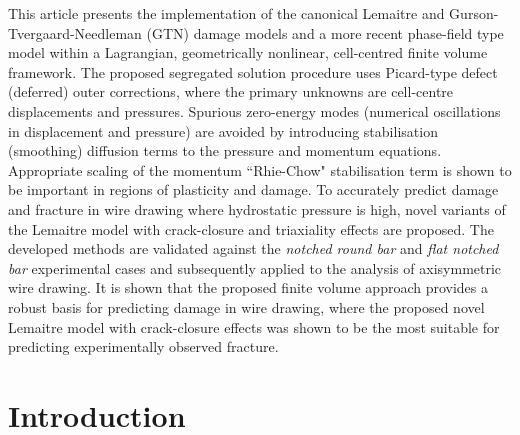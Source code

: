 \documentclass[sn-mathphys,Numbered]{sn-jnl}%
\begin{document}
\abstract
{
This article presents the implementation of the canonical Lemaitre and Gurson-Tvergaard-Needleman (GTN) damage models and a more recent phase-field type model within a Lagrangian, geometrically nonlinear, cell-centred finite volume framework.
The proposed segregated solution procedure uses Picard-type defect (deferred) outer corrections, where the primary unknowns are cell-centre displacements and pressures.
Spurious zero-energy modes (numerical oscillations in displacement and pressure) are avoided by introducing stabilisation (smoothing) diffusion terms to the pressure and momentum equations.
Appropriate scaling of the momentum ``Rhie-Chow" stabilisation term is shown to be important in regions of plasticity and damage.
To accurately predict damage and fracture in wire drawing where hydrostatic pressure is high, novel variants of the Lemaitre model with crack-closure and triaxiality effects are proposed.
The developed methods are validated against the \emph{notched round bar} and \emph{flat notched bar} experimental cases and subsequently applied to the analysis of axisymmetric wire drawing.
It is shown that the proposed finite volume approach provides a robust basis for predicting damage in wire drawing, where the proposed novel Lemaitre model with crack-closure effects was shown to be the most suitable for predicting experimentally observed fracture.
}




\maketitle


\section{Introduction}\label{sec:intro}
\end{document}
